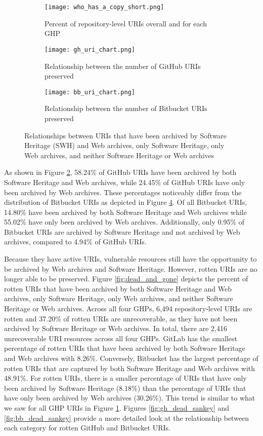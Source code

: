\begin{figure}
\centering
\begin{subfigure}{0.9\textwidth}
    \texttt{[image: who\_has\_a\_copy\_short.png]}
    \caption{Percent of repository-level URIs overall and for each GHP}
    \label{fig:who_has_a_copy}
\end{subfigure}
\begin{subfigure}{0.9\textwidth}
    \centering
    \texttt{[image: gh\_uri\_chart.png]}
    \caption{Relationship between the number of GitHub URIs preserved}
    \label{fig:gh_sankey}
\end{subfigure}
\begin{subfigure}{0.9\textwidth}
    \centering
    \texttt{[image: bb\_uri\_chart.png]}
    \caption{Relationship between the number of Bitbucket URIs preserved}
    \label{fig:bb_sankey}
\end{subfigure}
\caption{Relationships between URIs that have been archived by Software Heritage (SWH) and Web archives, only Software Heritage, only Web archives, and neither Software Heritage or Web archives}
\end{figure}

As shown in Figure \ref{fig:gh_sankey}, 58.24\% of GitHub URIs have been archived by both Software Heritage and Web archives, while 24.45\% of GitHub URIs have only been archived by Web archives. These percentages noticeably differ from the distribution of Bitbucket URIs as depicted in Figure 
\ref{fig:bb_sankey}. Of all Bitbucket URIs, 14.80\% have been archived by both Software Heritage and Web archives while 55.02\% have only been archived by Web archives. Additionally, only 0.95\% of Bitbucket URIs are archived by Software Heritage and not archived by Web archives, compared to 4.94\% of GitHub URIs. 

Because they have active URIs, vulnerable resources still have the opportunity to be archived by Web archives and Software Heritage. However, rotten URIs are no longer able to be preserved. Figure \ref{fig:dead_and_gone} depicts the percent of rotten URIs that have been archived by both Software Heritage and Web archives, only Software Heritage, only Web archives, and neither Software Heritage or Web archives. Across all four GHPs, 6,494 repository-level URIs are rotten and 37.20\% of rotten URIs are unrecoverable, as they have not been archived by Software Heritage or Web archives. In total, there are 2,416 unrecoverable URI resources across all four GHPs. GitLab has the smallest percentage of rotten URIs that have been archived by both Software Heritage and Web archives with 8.26\%. Conversely, Bitbucket has the largest percentage of rotten URIs that are captured by both Software Heritage and Web archives with 48.91\%. For rotten URIs, there is a smaller percentage of URIs that have only been archived by Software Heritage (8.18\%) than the percentage of URIs that have only been archived by Web archives (30.26\%). This trend is similar to what we saw for all GHP URIs in Figure \ref{fig:who_has_a_copy}. Figures \ref{fig:gh_dead_sankey} and \ref{fig:bb_dead_sankey} provide a more detailed look at the relationship between each category for rotten GitHub and Bitbucket URIs. 

